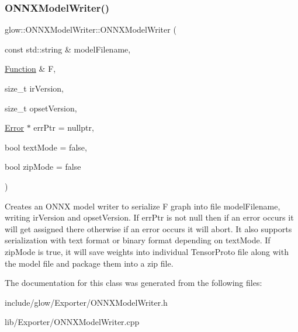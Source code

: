 \subsubsection{\texorpdfstring{O\+N\+N\+X\+Model\+Writer()}{ONNXModelWriter()}}
{\footnotesize\ttfamily glow\+::\+O\+N\+N\+X\+Model\+Writer\+::\+O\+N\+N\+X\+Model\+Writer (\begin{DoxyParamCaption}\item[{const std\+::string \&}]{model\+Filename,  }\item[{\hyperlink{classglow_1_1_function}{Function} \&}]{F,  }\item[{size\+\_\+t}]{ir\+Version,  }\item[{size\+\_\+t}]{opset\+Version,  }\item[{\hyperlink{namespaceglow_afdb176c3a672ef66db0ecfc19a8d39bf}{Error} $\ast$}]{err\+Ptr = {\ttfamily nullptr},  }\item[{bool}]{text\+Mode = {\ttfamily false},  }\item[{bool}]{zip\+Mode = {\ttfamily false} }\end{DoxyParamCaption})}

Creates an O\+N\+NX model writer to serialize {\ttfamily F} graph into file {\ttfamily model\+Filename}, writing {\ttfamily ir\+Version} and {\ttfamily opset\+Version}. If {\ttfamily err\+Ptr} is not null then if an error occurs it will get assigned there otherwise if an error occurs it will abort. It also supports serialization with text format or binary format depending on {\ttfamily text\+Mode}. If {\ttfamily zip\+Mode} is true, it will save weights into individual Tensor\+Proto file along with the model file and package them into a zip file. 

The documentation for this class was generated from the following files\+:\begin{DoxyCompactItemize}
\item 
include/glow/\+Exporter/O\+N\+N\+X\+Model\+Writer.\+h\item 
lib/\+Exporter/O\+N\+N\+X\+Model\+Writer.\+cpp\end{DoxyCompactItemize}
